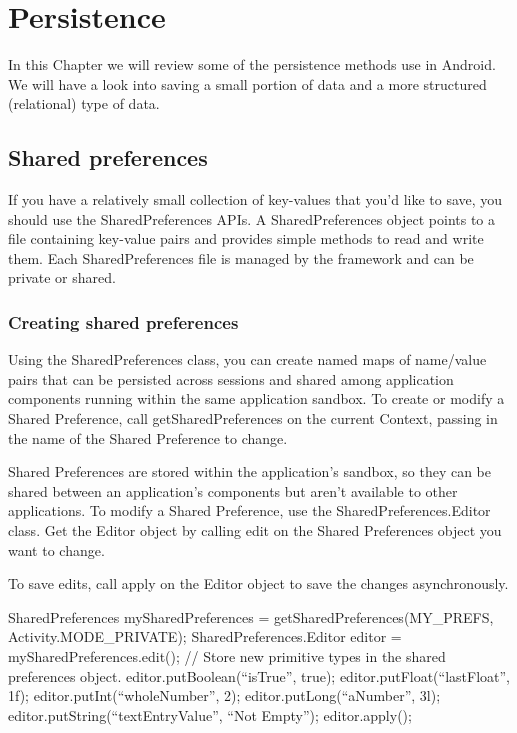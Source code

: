 
\chapter{Persistence}
In this Chapter we will review some of the persistence methods use in Android. We will have a look into saving a small portion of data and a more structured (relational) type of data.

\section{Shared preferences}
If you have a relatively small collection of key-values that you'd like to save, you should use the SharedPreferences APIs. A SharedPreferences object points to a file containing key-value pairs and provides simple methods to read and write them. Each SharedPreferences file is managed by the framework and can be private or shared.

\subsection{Creating shared preferences}
Using the SharedPreferences class, you can create named maps of name/value pairs that can be persisted across sessions and shared among application components running within the same application sandbox. To create or modify a Shared Preference, call getSharedPreferences on the current Context, passing in the name of the Shared Preference to change.

Shared Preferences are stored within the application’s sandbox, so they can be shared between an application’s components but aren’t available to other applications. To modify a Shared Preference, use the SharedPreferences.Editor class. Get the Editor object by calling edit on the Shared Preferences object you want to change.

To save edits, call apply on the Editor object to save the changes asynchronously.
\begin{android}
SharedPreferences mySharedPreferences = getSharedPreferences(MY_PREFS, 
Activity.MODE_PRIVATE);
SharedPreferences.Editor editor = mySharedPreferences.edit();
// Store new primitive types in the shared preferences object.
editor.putBoolean(“isTrue”, true);
editor.putFloat(“lastFloat”, 1f);
editor.putInt(“wholeNumber”, 2);
editor.putLong(“aNumber”, 3l);
editor.putString(“textEntryValue”, “Not Empty”);
editor.apply();
\end{android}


